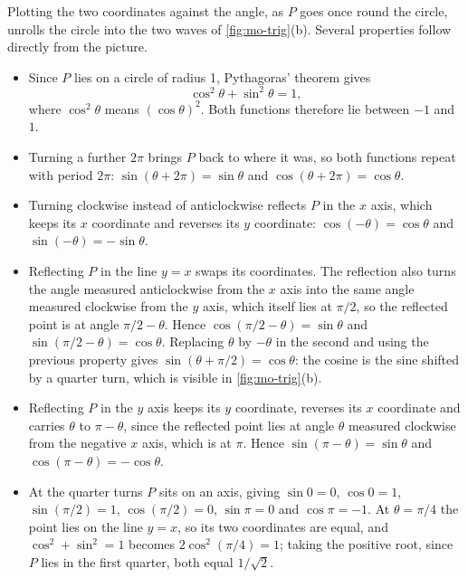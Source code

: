Plotting the two coordinates against the angle, as $P$ goes once round
the circle, unrolls the circle into the two waves of \cref{fig:mo-trig}(b).
Several properties follow directly from the picture.
\begin{itemize}
\item Since $P$ lies on a circle of radius 1, Pythagoras' theorem gives
   \begin{equation*}
      \cos^2\theta + \sin^2\theta = 1 ,
   \end{equation*}
   where $\cos^2\theta$ means $(\cos\theta)^2$. Both functions therefore
   lie between $-1$ and $1$.
\item Turning a further $2\pi$ brings $P$ back to where it was, so both
   functions repeat with period $2\pi$: $\sin(\theta + 2\pi) = \sin\theta$
   and $\cos(\theta + 2\pi) = \cos\theta$.
\item Turning clockwise instead of anticlockwise reflects $P$ in the $x$
   axis, which keeps its $x$ coordinate and reverses its $y$ coordinate:
   $\cos(-\theta) = \cos\theta$ and $\sin(-\theta) = -\sin\theta$.
\item Reflecting $P$ in the line $y = x$ swaps its coordinates. The
   reflection also turns the angle measured anticlockwise from the $x$ axis
   into the same angle measured clockwise from the $y$ axis, which itself
   lies at $\pi/2$, so the
   reflected point is at angle $\pi/2 - \theta$. Hence $\cos(\pi/2 - \theta)
   = \sin\theta$ and $\sin(\pi/2 - \theta) = \cos\theta$. Replacing $\theta$
   by $-\theta$ in the second and using the previous property gives
   $\sin(\theta + \pi/2) = \cos\theta$: the cosine is the sine shifted by a
   quarter turn, which is visible in \cref{fig:mo-trig}(b).
\item Reflecting $P$ in the $y$ axis keeps its $y$ coordinate, reverses its
   $x$ coordinate and carries $\theta$ to $\pi - \theta$, since the
   reflected point lies at angle $\theta$ measured clockwise from the
   negative $x$ axis, which is at $\pi$. Hence $\sin(\pi -
   \theta) = \sin\theta$ and $\cos(\pi - \theta) = -\cos\theta$.
\item At the quarter turns $P$ sits on an axis, giving $\sin 0 = 0$, $\cos
   0 = 1$, $\sin(\pi/2) = 1$, $\cos(\pi/2) = 0$, $\sin\pi = 0$ and $\cos\pi
   = -1$. At $\theta = \pi/4$ the point lies on the line $y = x$, so its two
   coordinates are equal, and $\cos^2 + \sin^2 = 1$ becomes $2\cos^2(\pi/4)
   = 1$; taking the positive root, since $P$ lies in the first quarter,
   both equal $1/\sqrt2$.
\end{itemize}
